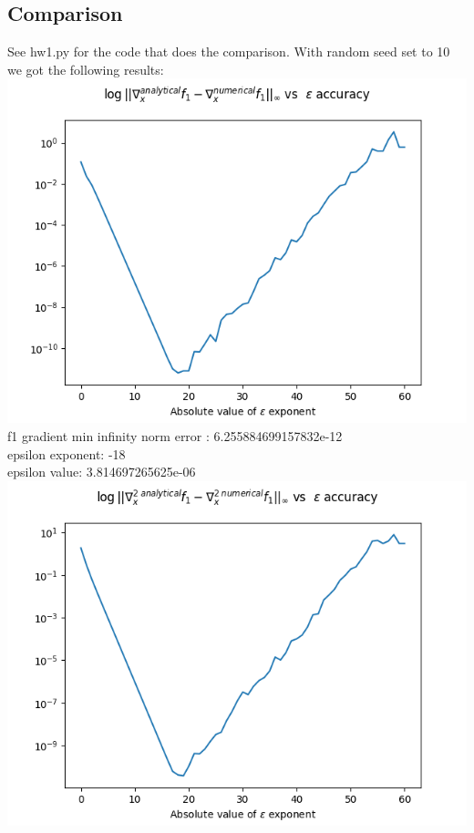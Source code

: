 \documentclass[12pt]{article}
\begin{document}
\subsection{Comparison}
See hw1.py for the code that does the comparison.
With random seed set to 10 we got the following results:\\
\includegraphics[scale=0.7]{f1_grad_plot}\\
f1 gradient min infinity norm error : 6.255884699157832e-12\\
epsilon exponent: -18\\
epsilon value: 3.814697265625e-06\\
\includegraphics[scale=0.7]{f1_hessian_plot}\\
\end{document}
